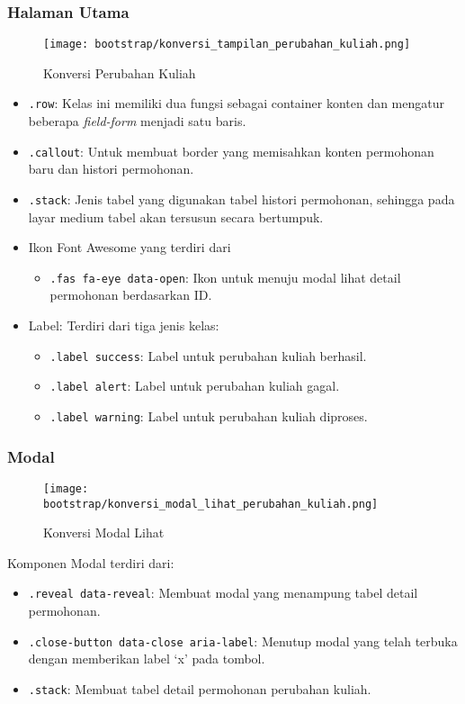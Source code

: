 \subsubsection{Halaman Utama}
\begin{figure} [H]
	\centering  
	\texttt{[image: bootstrap/konversi\_tampilan\_perubahan\_kuliah.png]}
	\caption{Konversi Perubahan Kuliah}
\end{figure}
\begin{itemize}
	\item \texttt{.row}: Kelas ini memiliki dua fungsi sebagai container konten dan mengatur beberapa \textit{field-form} menjadi satu baris. 
	\item \texttt{.callout}: Untuk membuat border yang memisahkan konten permohonan baru dan histori permohonan.
	\item \texttt{.stack}: Jenis tabel yang digunakan tabel histori permohonan, sehingga pada layar medium tabel akan tersusun secara bertumpuk.
	\item Ikon Font Awesome yang terdiri dari 
	\begin{itemize}
		\item \texttt{.fas fa-eye data-open}: Ikon untuk menuju modal lihat detail permohonan berdasarkan ID.
	\end{itemize}
	\item Label: Terdiri dari tiga jenis kelas:
	\begin{itemize}
		\item \texttt{.label success}: Label untuk perubahan kuliah berhasil.
		\item \texttt{.label alert}: Label untuk perubahan kuliah gagal.
		\item \texttt{.label warning}: Label untuk perubahan kuliah diproses.
	\end{itemize}
	
\end{itemize}
\subsubsection{Modal}
\begin{figure} [H]
	\centering  
	\texttt{[image: bootstrap/konversi\_modal\_lihat\_perubahan\_kuliah.png]}
	\caption{Konversi Modal Lihat}
\end{figure}
Komponen Modal terdiri dari:
\begin{itemize}
	\item \texttt{.reveal data-reveal}: Membuat modal yang menampung tabel detail permohonan.
	\item \texttt{.close-button data-close aria-label}: Menutup modal yang telah terbuka dengan memberikan label `x' pada tombol.
	\item \texttt{.stack}:	Membuat tabel detail permohonan perubahan kuliah.
\end{itemize}


